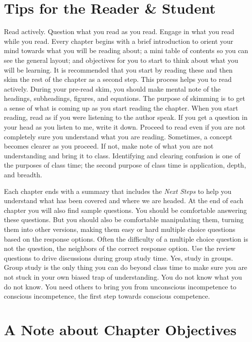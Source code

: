 \section*{Tips for the Reader \& Student}
Read actively. Question what you read as you read. Engage in what you read while you read. Every chapter begins with a brief introduction to orient your mind towards what you will be reading about; a mini table of contents so you can see the general layout; and objectives for you to start to think about what you will be learning. It is recommended that you start by reading these and then skim the rest of the chapter as a second step. This process helps you to read actively. During your pre-read skim, you should make mental note of the headings, subheadings, figures, and equations. The purpose of skimming is to get a sense of what is coming up as you start reading the chapter. When you start reading, read as if you were listening to the author speak. If you get a question in your head as you listen to me, write it down. Proceed to read even if you are not completely sure you understand what you are reading. Sometimes, a concept becomes clearer as you proceed. If not, make note of what you are not understanding and bring it to class. Identifying and clearing confusion is one of the purposes of class time; the second purpose of class time is application, depth, and breadth.

Each chapter ends with a summary that includes the \textit{Next Steps} to help you understand what has been covered and where we are headed. At the end of each chapter you will also find sample questions. You should be comfortable answering these questions. But you should also be comfortable manipulating them, turning them into other versions, making them easy or hard multiple choice questions based on the response options. Often the difficulty of a multiple choice question is not the question, the neighbors of the correct response option. Use the review questions to drive discussions during group study time. Yes, study in groups. Group study is the only thing you can do beyond class time to make sure you are not stuck in your own biased trap of understanding. You do not know what you do not know. You need others to bring you from unconscious incompetence to conscious incompetence, the first step towards conscious competence. 

\section*{A Note about Chapter Objectives}

